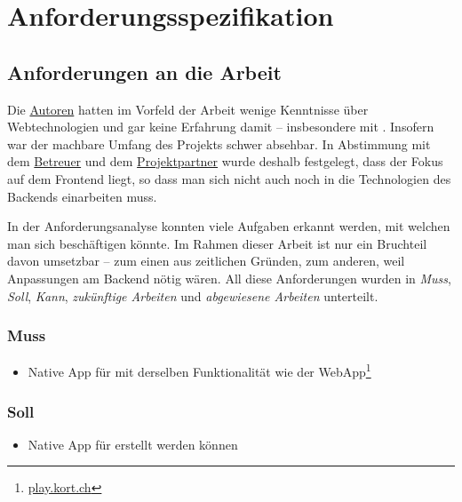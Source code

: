 \chapter{Anforderungsspezifikation}
\label{pd-anforderungsspezifikation}


\section{Anforderungen an die Arbeit} 
Die \hyperref[pm-rollen]{Autoren} hatten im Vorfeld der Arbeit wenige Kenntnisse über Webtechnologien und gar keine Erfahrung damit – insbesondere mit .
Insofern war der machbare Umfang des Projekts schwer absehbar.
In Abstimmung mit dem \hyperref[pm-rollen]{Betreuer} und dem \hyperref[pm-rollen]{Projektpartner} wurde deshalb festgelegt, dass der Fokus auf dem Frontend liegt, so dass man sich nicht auch noch in die Technologien des Backends einarbeiten muss.

In der Anforderungsanalyse konnten viele Aufgaben erkannt werden, mit welchen man sich beschäftigen könnte. Im Rahmen dieser Arbeit ist nur ein Bruchteil davon umsetzbar – zum einen aus zeitlichen Gründen, zum anderen, weil Anpassungen am Backend nötig wären.
All diese Anforderungen wurden in \emph{Muss}, \emph{Soll}, \emph{Kann}, \emph{zukünftige Arbeiten} und \emph{abgewiesene Arbeiten} unterteilt.

\subsection{Muss}
\begin{itemize}
	\item Native App für  mit derselben Funktionalität wie der \gls{WebApp}\footnote{\url{play.kort.ch}}
\end{itemize}

\subsection{Soll}
\begin{itemize}
	\item Native App für erstellt werden können
\end{itemize}

